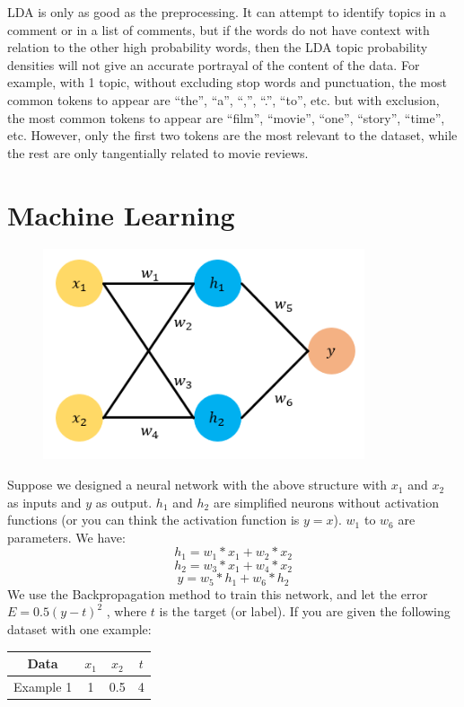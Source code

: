 \documentclass[conference]{IEEEtran}
\begin{document}
\begin{enumerate}
    LDA is only as good as the preprocessing. It can attempt to identify topics in a comment or in a list of comments, but if the words do not have context with relation to the other high probability words, then the LDA topic probability densities will not give an accurate portrayal of the content of the data. For example, with 1 topic, without excluding stop words and punctuation, the most common tokens to appear are “the”, “a”, “,”, “.”, “to”, etc. but with exclusion, the most common tokens to appear are “film”, “movie”, “one”, “story”, “time”, etc. However, only the first two tokens are the most relevant to the dataset, while the rest are only tangentially related to movie reviews.
    
\end{enumerate}
\newpage
\section{Machine Learning}
\begin{figure}[H]
    \centering
    \includegraphics[scale=0.35]{HW 1 Neural Network Screenshot.png}
\end{figure}
Suppose we designed a neural network with the above structure with $x_1$ and $x_2$ as inputs and $y$ as output. $h_1$ and $h_2$ are simplified neurons without activation functions (or you can think the activation function is $y=x$). $w_1$ to $w_6$ are parameters. We have:
$$h_1 = w_1 * x_1 + w_2 * x_2$$
$$h_2 = w_3 * x_1 + w_4 * x_2$$
$$y = w_5 * h_1 + w_6 * h_2$$
We use the Backpropagation method to train this network, and let the error $E = 0.5(y-t)^2$ , where $t$ is the target (or label). If you are given the following dataset with one example:
\begin{table}[H]
    \centering
    \begin{tabular}{|c|c|c|c|}
     \hline
        Data & $x_1$ & $x_2$ & $t$ \\
     \hline
        Example 1 & 1 & 0.5 & 4 \\
     \hline
    \end{tabular}
\end{table}
\end{document}
